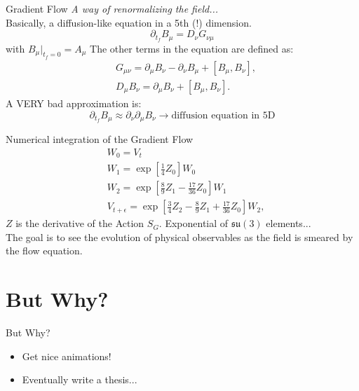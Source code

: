 \documentclass[10pt]{beamer}
\begin{document}
\begin{frame}{Gradient Flow}
	\textit{A way of renormalizing the field...}\\
	Basically, a diffusion-like equation in a 5th (!) dimension.
	\begin{equation}\nonumber
		\partial_{t_f}{B}_\mu = D_\nu G_{\nu\mu}
	\end{equation}\nonumber
	with $B_{\mu}|_{t_f = 0} = A_\mu$
	The other terms in the equation are defined as:
\begin{align}\nonumber
    &G_{\mu\nu} = \partial_\mu B_\nu - \partial_\nu B_\mu + [B_\mu, B_\nu] , \\\nonumber
    &D_{\mu}B_\nu = \partial_\mu B_\nu + [B_\mu, B_\nu ].
\end{align}
A VERY bad approximation is:
\begin{equation}\nonumber
	\partial_{t_f}{B}_\mu \approx \partial_\nu \partial_\mu B_\nu \rightarrow \text{diffusion equation in 5D}
\end{equation}
\end{frame}

\begin{frame}{Numerical integration of the Gradient Flow}
	\begin{align}\nonumber
		&W_0 = V_t\\\nonumber
		&W_1 = \exp\left[ \frac{1}{4}Z_0 \right] W_0 \\\nonumber
		&W_2 = \exp\left[ \frac{8}{9}Z_1 - \frac{17}{36}Z_0 \right] W_1\\\nonumber
		&V_{t+\epsilon} = \exp\left[ \frac{3}{4}Z_2 - \frac{8}{9}Z_1 + \frac{17}{36}Z_0\right] W_2,
	\end{align}
	$Z$ is the derivative of the Action $S_G$. Exponential of $\mathfrak{su}(3)$ elements...\\
	The goal is to see the evolution of physical observables as the field is smeared by the flow equation.
\end{frame}


\section{But Why?}
\begin{frame}{But Why?}
	\begin{itemize}
		\item Get nice animations!
		\item Eventually write a thesis...
	\end{itemize}
\end{frame}
\end{document}
